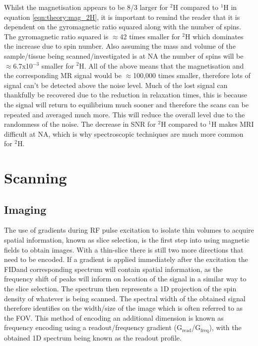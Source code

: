 Whilst the magnetisation appears to be 8/3 larger for $^2$H compared to $^1$H in equation \ref{eqn:theory:mag_2H}, it is important to remind the reader that it is dependent on the gyromagnetic ratio squared along with the number of spins. The gyromagnetic ratio squared is $\approx$42 times smaller for $^2$H which dominates the increase due to spin number. Also assuming the mass and volume of the sample/tissue being scanned/investigated is at \ac{NA} the number of spins will be $\approx$6.7x10$^{-3}$ smaller for $^2$H. All of the above means that the magnetisation and the corresponding MR signal would be $\approx$100,000 times smaller, therefore lots of signal can't be detected above the noise level. Much of the lost signal can thankfully be recovered due to the reduction in relaxation times, this is because the signal will return to equilibrium much sooner and therefore the scans can be repeated and averaged much more. This will reduce the overall level due to the randomness of the noise. The decrease in \ac{SNR} for $^2$H compared to $^1$H makes \ac{MRI} difficult at \ac{NA}, which is why spectroscopic techniques are much more common for $^2$H. 


\section{Scanning}   

\subsection{Imaging}

The use of gradients during \ac{RF} pulse excitation to isolate thin volumes to acquire spatial information, known as slice selection, is the first step into using magnetic fields to obtain images. With a thin-slice there is still two more directions that need to be encoded. If a gradient is applied immediately after the excitation the \ac{FID}and corresponding spectrum will contain spatial information, as the frequency shift of peaks will inform on location of the signal in a similar way to the slice selection. The spectrum then represents a 1D projection of the spin density of whatever is being scanned. The spectral width of the obtained signal therefore identifies on the width/size of the image which is often referred to as the \ac{FOV}. This method of encoding an additional dimension is known as frequency encoding using a readout/frequency gradient (G$_{\textrm{read}}$/G$_{\textrm{freq}}$), with the obtained 1D spectrum being known as the readout profile.

